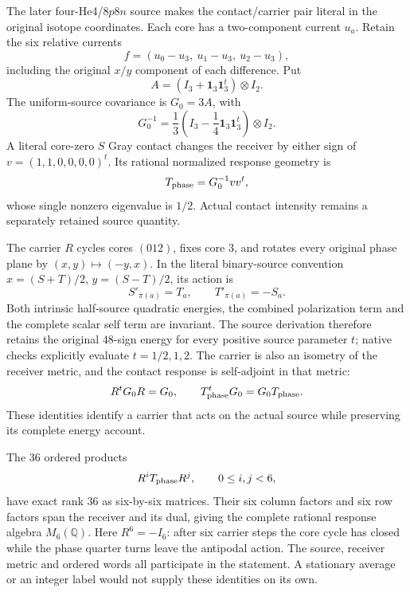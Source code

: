 The later four-He4/$8p8n$ source makes the contact/carrier pair literal in the original isotope coordinates. Each core has a two-component current $u_a$. Retain the six relative currents
\begin{equation}
 f=(u_0-u_3,\ u_1-u_3,\ u_2-u_3),
\end{equation}
including the original $x/y$ component of each difference. Put
\begin{equation}
 A=(I_3+\mathbf1_3\mathbf1_3^t)\otimes I_2.
\end{equation}
The uniform-source covariance is $G_0=3A$, with
\begin{equation}
 G_0^{-1}=\frac13\left(I_3-\frac14\mathbf1_3\mathbf1_3^t\right)\otimes I_2.
\end{equation}
A literal core-zero $S$ Gray contact changes the receiver by either sign of $v=(1,1,0,0,0,0)^t$. Its rational normalized response geometry is
\begin{equation}
 T_{\rm phase}=G_0^{-1}vv^t,
\end{equation}
whose single nonzero eigenvalue is $1/2$. Actual contact intensity remains a separately retained source quantity.

The carrier $R$ cycles cores $(012)$, fixes core $3$, and rotates every original phase plane by $(x,y)\mapsto(-y,x)$. In the literal binary-source convention $x=(S+T)/2$, $y=(S-T)/2$, its action is
\begin{equation}
 S'_{\pi(a)}=T_a,\qquad T'_{\pi(a)}=-S_a.
\end{equation}
Both intrinsic half-source quadratic energies, the combined polarization term and the complete scalar self term are invariant. The source derivation therefore retains the original $48$-sign energy for every positive source parameter $t$; native checks explicitly evaluate $t=1/2,1,2$. The carrier is also an isometry of the receiver metric, and the contact response is self-adjoint in that metric:
\begin{equation}
 R^tG_0R=G_0,\qquad T_{\rm phase}^tG_0=G_0T_{\rm phase}.
\end{equation}
These identities identify a carrier that acts on the actual source while preserving its complete energy account.

The $36$ ordered products
\begin{equation}
 R^iT_{\rm phase}R^j,\qquad 0\leq i,j<6,
\end{equation}
have exact rank $36$ as six-by-six matrices. Their six column factors and six row factors span the receiver and its dual, giving the complete rational response algebra $M_6(\mathbb Q)$. Here $R^6=-I_6$: after six carrier steps the core cycle has closed while the phase quarter turns leave the antipodal action. The source, receiver metric and ordered words all participate in the statement. A stationary average or an integer label would not supply these identities on its own.

